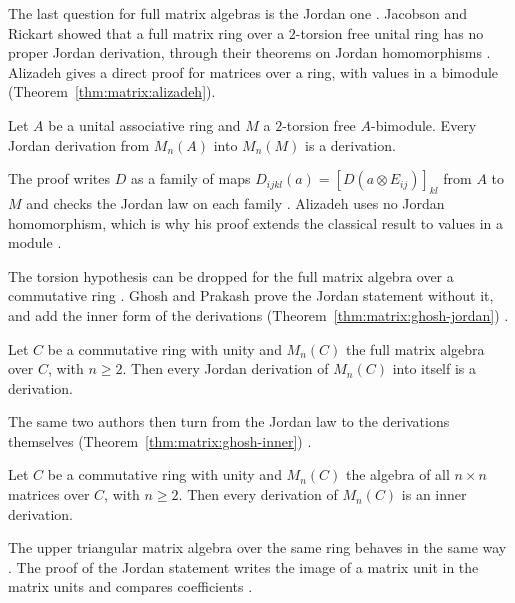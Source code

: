 The last question for full matrix algebras is the Jordan one
\cite[p.~574]{Alizadeh2009}. Jacobson and
Rickart showed that a full matrix ring over a $2$-torsion free unital ring has
no proper Jordan derivation, through their theorems on Jordan homomorphisms
\cite[p.~574]{Alizadeh2009}. Alizadeh gives a direct proof for matrices over a
ring, with values in a bimodule (Theorem~\ref{thm:matrix:alizadeh}).

\begin{theorem}\label{thm:matrix:alizadeh}
Let $A$ be a unital associative ring and $M$ a $2$-torsion free $A$-bimodule.
Every Jordan derivation from $M_n(A)$ into $M_n(M)$ is a derivation.
\end{theorem}

The proof writes $D$ as a family of maps $D_{ijkl}(a)=[D(a\otimes E_{ij})]_{kl}$
from $A$ to $M$ and checks the Jordan law on each family
\cite[p.~575]{Alizadeh2009}. Alizadeh uses no Jordan homomorphism, which is why his proof
extends the classical result to values in a module \cite[p.~575]{Alizadeh2009}.

The torsion hypothesis can be dropped for the full matrix algebra over a
commutative ring \cite[p.~2]{GhoshPrakash2018}. Ghosh and Prakash prove the
Jordan statement without it, and add the inner form of the derivations (Theorem~\ref{thm:matrix:ghosh-jordan})
\cite[Theorem~3.2, p.~8]{GhoshPrakash2018}.\begin{theorem}\label{thm:matrix:ghosh-jordan}
Let $C$ be a commutative ring with unity and $M_n(C)$ the full matrix algebra
over $C$, with $n\geq2$. Then every Jordan derivation of $M_n(C)$ into itself
is a derivation.
\end{theorem}

The same two authors then turn from the Jordan law to the derivations
themselves (Theorem~\ref{thm:matrix:ghosh-inner}) \cite[p.~5]{GhoshPrakash2018}.

\begin{theorem}\label{thm:matrix:ghosh-inner}
Let $C$ be a commutative ring with unity and $M_n(C)$ the algebra of all
$n\times n$ matrices over $C$, with $n\geq2$. Then every derivation of $M_n(C)$
is an inner derivation.
\end{theorem}

The upper triangular matrix algebra over the same ring behaves in the same way
\cite[Theorem~2.1 and Theorem~2.2, pp.~3 and~5]{GhoshPrakash2018}. The proof of
the Jordan statement writes the image of a matrix unit in the matrix units and
compares coefficients \cite[pp.~5--8]{GhoshPrakash2018}.

